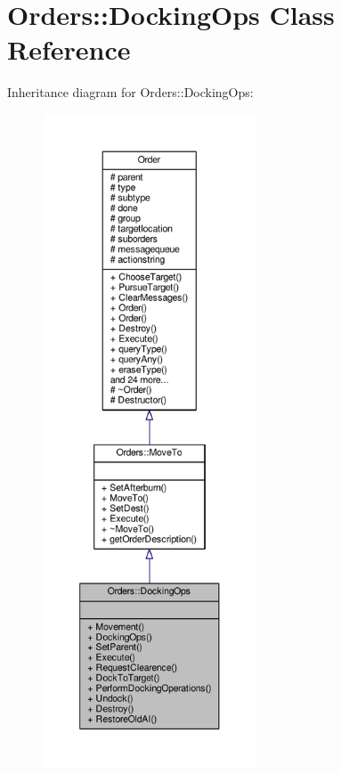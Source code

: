 \hypertarget{classOrders_1_1DockingOps}{}\section{Orders\+:\+:Docking\+Ops Class Reference}
\label{classOrders_1_1DockingOps}


Inheritance diagram for Orders\+:\+:Docking\+Ops\+:
\nopagebreak
\begin{figure}[H]
\begin{center}
\leavevmode
\includegraphics[height=550pt]{d9/dfa/classOrders_1_1DockingOps__inherit__graph}
\end{center}
\end{figure}


